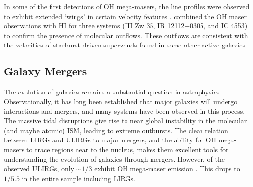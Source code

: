 In some of the first detections of OH mega-masers, the line profiles were observed to exhibit extended `wings' in certain velocity features \citep{Baan_1987,Baan_1989}. \citet{Baan_1989} combined the OH maser observations with HI for three systems (III Zw 35, IR 12112+0305, and IC 4553) to confirm the presence of molecular outflows. These outflows are consistent with the velocities of starburst-driven superwinds found in some other active galaxies. 





\subsection{Galaxy Mergers}
\label{sub:oh_mergers}

The evolution of galaxies remains a substantial question in astrophysics. Observationally, it has long been established that major galaxies will undergo interactions and mergers, and many systems have been observed in this process. The massive tidal disruptions give rise to near global instability in the molecular (and maybe atomic) ISM, leading to extreme outbursts. The clear relation between LIRGs and ULIRGs to major mergers, and the ability for OH mega-masers to trace regions near to the nucleus, makes them excellent tools for understanding the evolution of galaxies through mergers. However, of the observed ULIRGs, only $\sim 1/3$ exhibit OH mega-maser emission \citep{darling2002_paperIII}. This drops to $1/5.5$ in the entire sample including LIRGs.

